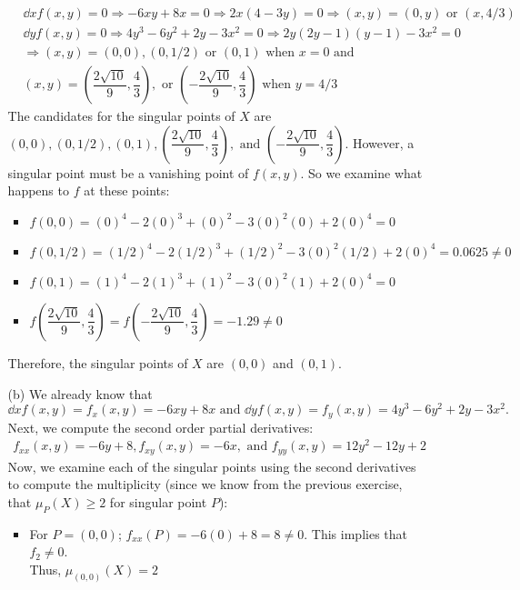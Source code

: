 \documentclass[11pt]{article}
\begin{document}
\begin{enumerate}
\begin{itemize}
\begin{align*}
				&\dd {x}f(x,y) = 0 \Longrightarrow -6xy + 8x = 0 \Longrightarrow 2x(4-3y) = 0\Longrightarrow (x,y) = (0,y) \text{ or } (x, 4/3)&\\&
				\dd {y}f(x,y) = 0 \Longrightarrow 4y^3 -6y^2 +2y -3x^2 = 0 \Longrightarrow 2y(2y-1)(y-1) -3x^2 = 0&\\&
				\Longrightarrow (x,y) = (0,0),(0,1/2) \text{ or } (0, 1) \text{ when } x =0 \text{ and }&\\
				&(x,y) = \left( \dfrac{2\sqrt{10}}{9},\dfrac{4}{3}\right) ,\text{ or }\left( -\dfrac{2\sqrt{10}}{9},\dfrac{4}{3}\right)  \text{ when } y = 4/3
			\end{align*}
			The candidates for the singular points of $X$ are $(0,0),(0,1/2), (0, 1), \left( \dfrac{2\sqrt{10}}{9},\dfrac{4}{3}\right) ,\text{ and }\left( -\dfrac{2\sqrt{10}}{9},\dfrac{4}{3}\right) $. However, a singular point must be a vanishing point of $f(x,y)$. So we examine what happens to $f$ at these points:
			\begin{itemize}
				\item $f(0,0) = (0)^4 - 2(0)^3 + (0)^2 - 3(0)^2(0) + 2(0)^4 = 0$ 
				\item $f(0,1/2) = (1/2)^4 - 2(1/2)^3 + (1/2)^2 - 3(0)^2(1/2) + 2(0)^4 = 0.0625 \neq 0$ 
				\item $f(0,1) = (1)^4 - 2(1)^3 + (1)^2 - 3(0)^2(1) + 2(0)^4 = 0$
				\item $f\left( \dfrac{2\sqrt{10}}{9},\dfrac{4}{3}\right) =f\left( -\dfrac{2\sqrt{10}}{9},\dfrac{4}{3}\right) =-1.29 \neq 0$
			\end{itemize}
			Therefore, the singular points of $X$ are $(0,0)$ and $(0,1)$.
			\item [(b)] We already know that $$\dd {x}f(x,y) = f_x(x,y) = -6xy + 8x \text{ and } \dd {y}f(x,y) = f_y(x,y) = 4y^3 -6y^2 +2y -3x^2.$$ Next, we compute the second order partial derivatives:
			\begin{align*}
				f_{xx}(x,y) = -6y +8, f_{xy}(x,y) = -6x, \text{ and } f_{yy}(x,y) = 12y^2 -12y + 2
			\end{align*}
			Now, we examine each of the singular points using the second derivatives to compute the multiplicity (since we know from the previous exercise, that $\mu _{P}(X)\geq 2$ for singular point $P$):
			\begin{itemize}
				\item For $P = (0,0)$;
				$
				f_{xx}(P) = -6(0) +8 = 8 \neq 0.
				$ This implies that $f_2 \neq 0$.\\
				Thus,  $\mu _{(0,0)}(X)=2$
				

\end{itemize}
\end{itemize}
\end{enumerate}
\end{document}
